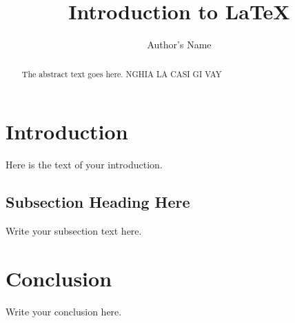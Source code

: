 \documentclass{article}
\begin{document}
\title{Introduction to \LaTeX{}}
\author{Author's Name}

\maketitle

\begin{abstract}
The abstract text goes here. NGHIA LA CASI GI VAY
\end{abstract}

\section{Introduction}
Here is the text of your introduction.

\subsection{Subsection Heading Here}
Write your subsection text here.

\section{Conclusion}
Write your conclusion here.
\end{document}
